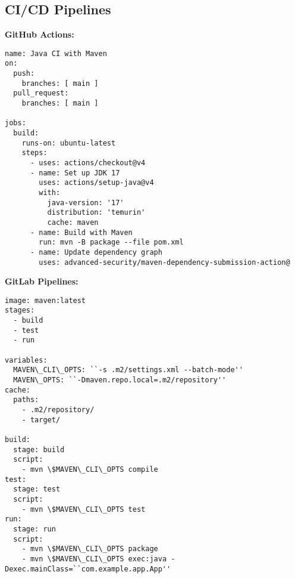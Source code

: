\subsection{CI/CD Pipelines}
\begin{frame}[fragile]{\insertsubsection}
	\begin{fancycolumns}
		\textbf{GitHub Actions:}
	\begin{lstlisting}[language={}, basicstyle=\tiny, breaklines=true, numbers=none]	
name: Java CI with Maven
on:
  push:
    branches: [ main ]
  pull_request:
    branches: [ main ]

jobs:
  build:
    runs-on: ubuntu-latest
    steps:
      - uses: actions/checkout@v4
      - name: Set up JDK 17
        uses: actions/setup-java@v4
        with:
          java-version: '17'
          distribution: 'temurin'
          cache: maven
      - name: Build with Maven
        run: mvn -B package --file pom.xml
      - name: Update dependency graph
        uses: advanced-security/maven-dependency-submission-action@
		\end{lstlisting}
		\nextcolumn
		\textbf{GitLab Pipelines:}
		\begin{lstlisting}[language={}, basicstyle=\tiny, breaklines=true, numbers=none]
image: maven:latest
stages:
  - build
  - test
  - run

variables:
  MAVEN\_CLI\_OPTS: ``-s .m2/settings.xml --batch-mode''
  MAVEN\_OPTS: ``-Dmaven.repo.local=.m2/repository''
cache:
  paths:
    - .m2/repository/
    - target/

build:
  stage: build
  script:
    - mvn \$MAVEN\_CLI\_OPTS compile
test:
  stage: test
  script:
    - mvn \$MAVEN\_CLI\_OPTS test
run:
  stage: run
  script:
    - mvn \$MAVEN\_CLI\_OPTS package
    - mvn \$MAVEN\_CLI\_OPTS exec:java -Dexec.mainClass=``com.example.app.App''

		\end{lstlisting}
	\end{fancycolumns}
\end{frame}

